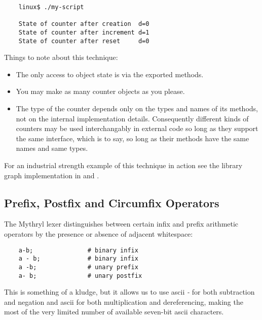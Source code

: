 \begin{verbatim}
    linux$ ./my-script

    State of counter after creation  d=0
    State of counter after increment d=1
    State of counter after reset     d=0
\end{verbatim}

Things to note about this technique:

\begin{itemize}
\item The only access to object state is via the exported methods.
\item You may make as many counter objects as you please.
\item The type of the counter depends only on the types and names of its methods, 
      not on the internal implementation details.  Consequently different kinds 
      of counters may be used interchangably in external code so long as they 
      support the same interface, which is to say, so long as their methods have 
      the same names and same types.
\end{itemize}

For an industrial strength example of this technique in action see the library 
graph implementation in  
 and 
.

\cutend*


\subsection{Prefix, Postfix and Circumfix Operators}

The Mythryl lexer distinguishes between certain infix and prefix arithmetic 
operators by the presence or absence of adjacent whitespace:

\begin{verbatim}
    a-b;               # binary infix
    a - b;             # binary infix
    a -b;              # unary prefix
    a- b;              # unary postfix
\end{verbatim}

This is something of a kludge, but it allows us to use ascii 
{\it -} for both subtraction and negation and ascii {\tt *} for 
both multiplication and dereferencing, making the most of the 
very limited number of available seven-bit ascii characters.

